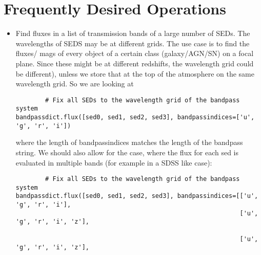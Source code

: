 \documentclass{article}[12pt]
\begin{document}
\section{Frequently Desired Operations}

\begin{itemize}
    \item Find fluxes in a list of transmission bands of a large number of SEDs. The wavelengths of SEDS may be at different grids. The use case is to find the fluxes/ mags of every object of a certain class (galaxy/AGN/SN) on a focal plane. Since these might be at different redshifts, the wavelength grid could be different), unless we store that at the top of the atmosphere on the same wavelength grid.
        So we are looking at 
    \begin{verbatim}
        # Fix all SEDs to the wavelength grid of the bandpass system
bandpassdict.flux([sed0, sed1, sed2, sed3], bandpassindices=['u', 'g', 'r', 'i'])
    \end{verbatim}
where the length of bandpassindices matches the length of the bandpass string.
We should also allow for the case, where the flux for each sed is evaluated in
multiple bands (for example in a SDSS like case):
    \begin{verbatim}
        # Fix all SEDs to the wavelength grid of the bandpass system
bandpassdict.flux([sed0, sed1, sed2, sed3], bandpassindices=[['u', 'g', 'r', 'i'],
                                                             ['u', 'g', 'r', 'i', 'z'],

                                                             ['u', 'g', 'r', 'i', 'z'],


\end{verbatim}
\end{itemize}
\end{document}
